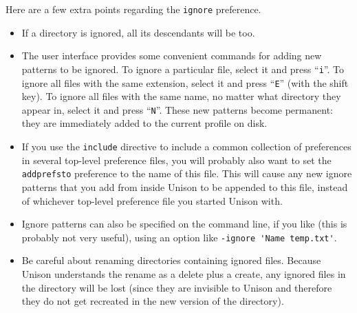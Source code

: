 \documentclass{article}
\begin{document}
Here are a few extra points regarding the \texttt{ignore} preference.
\begin{itemize}
\item If a directory is ignored, all its descendants will be too.

\item The user interface provides some convenient commands for adding
  new patterns to be ignored.  To ignore a particular file, select it
  and press ``{\tt i}''.  To ignore all files with the same extension,
  select it and press ``{\tt E}'' (with the shift key).  To ignore all
  files with the same name, no matter what directory they appear in,
  select it and press ``{\tt N}''.
%
These new patterns become permanent: they
are immediately added to the current profile on disk.

\item If you use the \verb|include| directive to include a common
collection of preferences in several top-level preference files, you will
probably also want to set the \verb|addprefsto| preference to the name of
this file.  This will cause any new ignore patterns that you add from
inside Unison to be appended to this file, instead of whichever top-level
preference file you started Unison with.

\item Ignore patterns can also be specified on the command line, if
you like (this is probably not very useful), using an option like
\verb|-ignore 'Name temp.txt'|.

\item Be careful about renaming directories containing ignored files.
Because Unison understands the rename as a delete plus a create, any ignored
files in the directory will be lost (since they are invisible to Unison and
therefore they do not get recreated in the new version of the directory).


\end{itemize}
\end{document}
